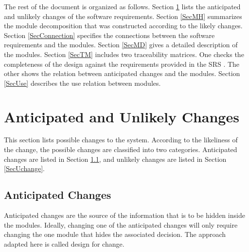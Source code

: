 \documentclass[12pt, titlepage]{article}
\begin{document}
The rest of the document is organized as follows. Section
\ref{SecChange} lists the anticipated and unlikely changes of the software
requirements. Section \ref{SecMH} summarizes the module decomposition that
was constructed according to the likely changes. Section \ref{SecConnection}
specifies the connections between the software requirements and the
modules. Section \ref{SecMD} gives a detailed description of the
modules. Section \ref{SecTM} includes two traceability matrices. One checks
the completeness of the design against the requirements provided in the SRS \citep{SRS}.
The other shows the relation between anticipated changes and the modules. Section
\ref{SecUse} describes the use relation between modules.

\section{Anticipated and Unlikely Changes} \label{SecChange}

This section lists possible changes to the system. According to the likeliness
of the change, the possible changes are classified into two
categories. Anticipated changes are listed in Section \ref{SecAchange}, and
unlikely changes are listed in Section \ref{SecUchange}.

\subsection{Anticipated Changes} \label{SecAchange}

Anticipated changes are the source of the information that is to be hidden
inside the modules. Ideally, changing one of the anticipated changes will only
require changing the one module that hides the associated decision. The approach
adapted here is called design for
change.
\end{document}
